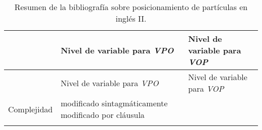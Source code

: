 \documentclass[12pt,spanish,a4paper,]{article}
\begin{document}
\begin{longtable}[]{@{}lccccc@{}}
\begin{minipage}[t]{0.13\columnwidth}
\strut
\end{minipage} & \begin{minipage}[t]{0.13\columnwidth}\centering
\strut
\end{minipage} & \begin{minipage}[t]{0.13\columnwidth}\centering
\strut
\end{minipage} & \begin{minipage}[t]{0.13\columnwidth}\centering
\strut
\end{minipage}\tabularnewline
\bottomrule
\end{longtable}

\begin{longtable}[]{@{}lll@{}}
\caption{\protect\hypertarget{cuadro2}{}{Resumen} de la bibliografía
sobre posicionamiento de partículas en inglés II.}\tabularnewline
\toprule
\begin{minipage}[b]{0.22\columnwidth}\raggedright
\strut
\end{minipage} & \begin{minipage}[b]{0.39\columnwidth}\raggedright
Nivel de variable para \emph{VPO}\strut
\end{minipage} & \begin{minipage}[b]{0.25\columnwidth}\raggedright
Nivel de variable para \emph{VOP}\strut
\end{minipage}\tabularnewline
\midrule
\endfirsthead
\toprule
\begin{minipage}[b]{0.22\columnwidth}\raggedright
\strut
\end{minipage} & \begin{minipage}[b]{0.39\columnwidth}\raggedright
Nivel de variable para \emph{VPO}\strut
\end{minipage} & \begin{minipage}[b]{0.25\columnwidth}\raggedright
Nivel de variable para \emph{VOP}\strut
\end{minipage}\tabularnewline
\midrule
\endhead
\begin{minipage}[t]{0.22\columnwidth}\raggedright
Complejidad\strut
\end{minipage} & \begin{minipage}[t]{0.39\columnwidth}\raggedright
modificado sintagmáticamente modificado por cláusula\strut
\end{minipage} & \begin{minipage}[t]{0.25\columnwidth}\raggedright
\strut
\end{minipage}\tabularnewline
\begin{minipage}[t]{0.22\columnwidth}\raggedright

\end{minipage}
\end{longtable}
\end{document}
